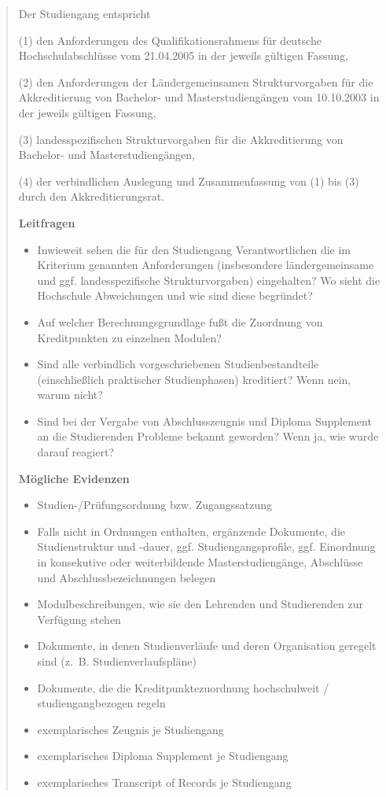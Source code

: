 \begin{quote}
Der Studiengang entspricht

(1) den Anforderungen des Qualifikationsrahmens für deutsche
Hochschulabschlüsse vom 21.04.2005 in der jeweils gültigen Fassung,

(2) den Anforderungen der Ländergemeinsamen Strukturvorgaben für die
Akkreditierung von Bachelor- und Masterstudiengängen vom 10.10.2003 in
der jeweils gültigen Fassung,

(3) landesspezifischen Strukturvorgaben für die Akkreditierung von
Bachelor- und Masterstudiengängen,

(4) der verbindlichen Auslegung und Zusammenfassung von (1) bis (3)
durch den Akkreditierungsrat.

\textbf{Leitfragen}

\begin{itemize}
\item
  Inwieweit sehen die für den Studiengang Verantwortlichen die im
  Kriterium genannten Anforderungen (insbesondere ländergemeinsame und
  ggf. landesspezifische Strukturvorgaben) eingehalten? Wo sieht die
  Hochschule Abweichungen und wie sind diese begründet?
\item
  Auf welcher Berechnungsgrundlage fußt die Zuordnung von Kreditpunkten
  zu einzelnen Modulen?
\item
  Sind alle verbindlich vorgeschriebenen Studienbestandteile
  (einschließlich praktischer Studienphasen) kreditiert? Wenn nein,
  warum nicht?
\item
  Sind bei der Vergabe von Abschlusszeugnis und Diploma Supplement an
  die Studierenden Probleme bekannt geworden? Wenn ja, wie wurde darauf
  reagiert?
\end{itemize}

\textbf{Mögliche Evidenzen}

\begin{itemize}
\item
  Studien-/Prüfungsordnung bzw. Zugangssatzung
\item
  Falls nicht in Ordnungen enthalten, ergänzende Dokumente, die
  Studienstruktur und -dauer, ggf. Studiengangsprofile, ggf. Einordnung
  in konsekutive oder weiterbildende Masterstudiengänge, Abschlüsse und
  Abschlussbezeichnungen belegen
\item
  Modulbeschreibungen, wie sie den Lehrenden und Studierenden zur
  Verfügung stehen
\item
  Dokumente, in denen Studienverläufe und deren Organisation geregelt
  sind (z.~B. Studienverlaufspläne)
\item
  Dokumente, die die Kreditpunktezuordnung hochschulweit /
  studiengangbezogen regeln
\item
  exemplarisches Zeugnis je Studiengang
\item
  exemplarisches Diploma Supplement je Studiengang
\item
  exemplarisches Transcript of Records je Studiengang
\end{itemize}
\end{quote}

